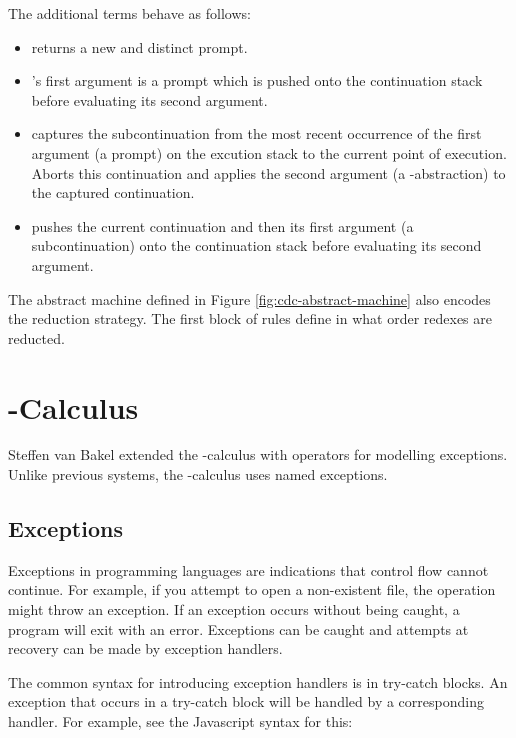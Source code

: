   The additional terms behave as follows:
  \begin{itemize}
  \item {} returns a new and distinct prompt.
  \item {}'s first argument is a prompt which is pushed onto the continuation stack before evaluating its second argument. 
  \item {} captures the subcontinuation from the most recent occurrence of the first argument (a prompt) on the excution stack to the current point of execution. Aborts this continuation and applies the second argument (a \lam-abstraction) to the captured continuation.
  \item {} pushes the current continuation and then its first argument (a subcontinuation) onto the continuation stack before evaluating its second argument.
  \end{itemize}
  
  The abstract machine defined in Figure \ref{fig:cdc-abstract-machine} also encodes the reduction strategy.
  The first block of rules define in what order redexes are reducted.
 
\section{\ltry-Calculus}

Steffen van Bakel extended the \lam-calculus with operators for modelling exceptions.
Unlike previous systems, the \ltry-calculus uses named exceptions.

\subsection{Exceptions}

Exceptions in programming languages are indications that control flow cannot continue.
For example, if you attempt to open a non-existent file,
the operation might throw an exception.
If an exception occurs without being caught, a program will exit with an error.
Exceptions can be caught and attempts at recovery can be made by exception handlers.

The common syntax for introducing exception handlers is in try-catch blocks.
An exception that occurs in a try-catch block will be handled by a corresponding handler.
For example, see the Javascript syntax for this:

